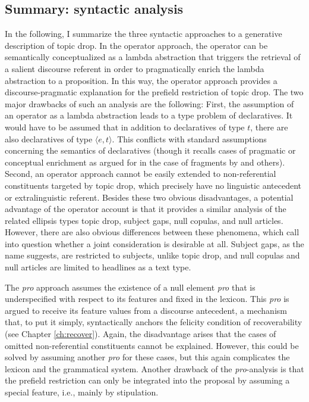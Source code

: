 \subsection{Summary: syntactic analysis}
In the following, I summarize the three syntactic approaches to a generative description of topic drop.
In the operator approach,  the operator can be semantically conceptualized as a lambda abstraction that triggers the retrieval of a salient  discourse referent in order to pragmatically enrich the lambda abstraction to a proposition.
In this way, the operator approach provides a discourse-pragmatic explanation for the prefield restriction of topic drop.
The two major drawbacks of such an analysis are the following:
First, the assumption of an operator as a lambda abstraction leads to a type problem of declaratives.
It would have to be assumed that in addition to declaratives of type $t$, there are also declaratives of type $\langle e,t\rangle$.
This conflicts with standard assumptions concerning the semantics of declaratives (though it recalls cases of pragmatic or conceptual enrichment as argued for in the case of fragments  by \cite{stainton2006} and others).
Second, an operator approach cannot be easily extended to non-referential constituents targeted by topic drop, which precisely have no linguistic antecedent or extralinguistic referent. 
Besides these two obvious disadvantages, a potential advantage of the operator account is that it provides a similar analysis of the related ellipsis types topic drop, subject gaps,  null copulas, and null articles. 
However, there are also obvious differences between these phenomena, which call into question whether a joint consideration is desirable at all.
Subject gaps,  as the name suggests, are restricted to subjects, unlike topic drop, and null copulas and null articles   are limited to headlines as a text type.  

The \textit{pro} approach assumes the existence of a null element \textit{pro} that is underspecified with respect to its features and fixed in the lexicon.
This \textit{pro} is argued to receive its feature values from a discourse antecedent,  a mechanism that, to put it simply, syntactically anchors the felicity condition of recoverability  (see Chapter \ref{ch:recover}).
Again, the disadvantage arises that the cases of omitted non-referential constituents cannot be explained.
However, this could be solved by assuming another \textit{pro} for these cases, but this again complicates the lexicon and the grammatical system.
Another drawback of the \textit{pro}-analysis is that the prefield restriction can only be integrated into the proposal by assuming a special feature, i.e., mainly by stipulation. 

